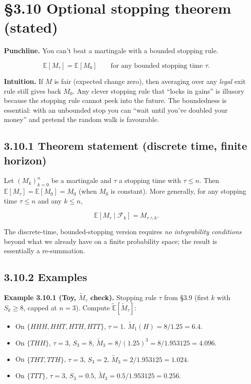 \documentclass[
  10pt,
  twoside]{book}
\providecommand{\tightlist}{%
  \setlength{\itemsep}{0pt}\setlength{\parskip}{0pt}}
\begin{document}
\section{§3.10 Optional stopping theorem
(stated)}\label{optional-stopping-theorem-stated}

\textbf{Punchline.} You can't beat a martingale with a bounded stopping
rule.

\[\mathbb E[M_\tau] = \mathbb E[M_0] \qquad \text{for any bounded stopping time } \tau.\]

\textbf{Intuition.} If \(M\) is fair (expected change zero), then
averaging over any \emph{legal} exit rule still gives back \(M_0\). Any
clever stopping rule that ``locks in gains'' is illusory because the
stopping rule cannot peek into the future. The boundedness is essential:
with an unbounded stop you can ``wait until you've doubled your money''
and pretend the random walk is favourable.

\subsection{3.10.1 Theorem statement (discrete time, finite
horizon)}\label{theorem-statement-discrete-time-finite-horizon}

Let \((M_k)_{k=0}^n\) be a martingale and \(\tau\) a stopping time with
\(\tau \le n\). Then \(\mathbb E[M_\tau] = \mathbb E[M_0] = M_0\) (when
\(M_0\) is constant). More generally, for any stopping time
\(\tau \le n\) and any \(k \le n\),

\[\mathbb E[M_\tau \mid \mathcal F_k] = M_{\tau \wedge k}.\]

The discrete-time, bounded-stopping version requires \emph{no
integrability conditions} beyond what we already have on a finite
probability space; the result is essentially a re-summation.

\subsection{3.10.2 Examples}\label{examples-20}

\textbf{Example 3.10.1 (Toy, \(\widetilde M_\tau\) check).} Stopping
rule \(\tau\) from §3.9 (first \(k\) with \(S_k \ge 8\), capped at
\(n=3\)). Compute \(\tilde{\mathbb E}[\widetilde M_\tau]\):

\begin{itemize}
\tightlist
\item
  On \(\{HHH, HHT, HTH, HTT\}\), \(\tau = 1\).
  \(\widetilde M_1(H) = 8/1.25 = 6.4\).
\item
  On \(\{THH\}\), \(\tau = 3\), \(S_3 = 8\),
  \(\widetilde M_3 = 8/(1.25)^3 = 8/1.953125 = 4.096\).
\item
  On \(\{THT, TTH\}\), \(\tau = 3\), \(S_3 = 2\),
  \(\widetilde M_3 = 2/1.953125 = 1.024\).
\item
  On \(\{TTT\}\), \(\tau = 3\), \(S_3 = 0.5\),
  \(\widetilde M_3 = 0.5/1.953125 = 0.256\).
\end{itemize}
\end{document}
